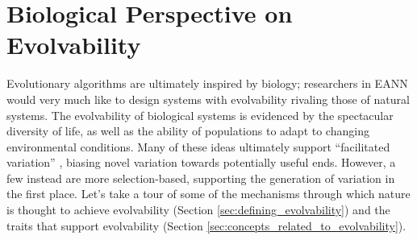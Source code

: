 \section{Biological Perspective on Evolvability} \label{sec:biological_perspective_on_evolvability}

Evolutionary algorithms are ultimately inspired by biology; researchers in EANN would very much like to design systems with evolvability rivaling those of natural systems. The evolvability of biological systems is evidenced by the spectacular diversity of life, as well as the ability of populations to adapt to changing environmental conditions. Many of these ideas ultimately support ``facilitated variation'' \cite[pg. 40]{Downing2015IntelligenceSystems}, biasing novel variation towards potentially useful ends. However, a few instead are more selection-based, supporting the generation of variation in the first place. Let's take a tour of some of the mechanisms through which nature is thought to achieve evolvability (Section \ref{sec:defining_evolvability}) and the traits that support evolvability (Section \ref{sec:concepts_related_to_evolvability}).


        
